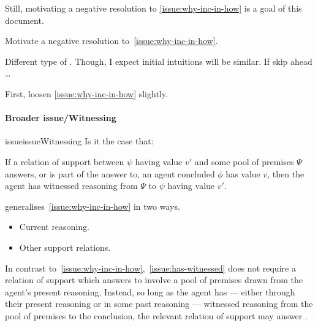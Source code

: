 \begin{note}
  Still, motivating a negative resolution to \autoref{issue:why-inc-in-how} is a goal of this document.

  \begin{goal}
    Motivate a negative resolution to~\autoref{issue:why-inc-in-how}.
  \end{goal}

  Different type of .
  Though, I expect initial intuitions will be similar.
  If skip ahead \dots

  First, loosen \autoref{issue:why-inc-in-how} slightly.
\end{note}

\paragraph*{Broader issue/Witnessing}

\begin{note}
  \begin{restatable}[Witnessing]{issue}{issueWitnessing}
    \label{issue:has-witnessed}
    Is it the case that:

    If a relation of support between \(\psi\) having value \(v'\) and some pool of premises \(\Psi\) answers, or is part of the answer to, \qWhy{} an agent concluded \(\phi\) has value \(v\), then the agent has witnessed reasoning from \(\Psi\) to \(\psi\) having value \(v'\).
  \end{restatable}

  {
    \color{red}
     generalises~\autoref{issue:why-inc-in-how} in two ways.
    \begin{itemize}
    \item
      Current reasoning.
    \item
      Other support relations.
    \end{itemize}
  }

  In contrast to~\autoref{issue:why-inc-in-how},~\autoref{issue:has-witnessed} does not require a relation of support which answers \qWhy{} to involve a pool of premises drawn from the agent's present reasoning.
  Instead, so long as the agent has --- either through their present reasoning or in some past reasoning --- witnessed reasoning from the pool of premises to the conclusion, the relevant relation of support may answer \qWhy{}.
\end{note}

